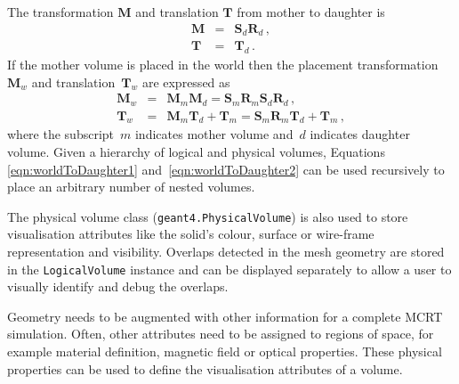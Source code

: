 \documentclass[preprint,12pt]{elsarticle}
\newcommand{\pyinline}[1]{\lstinline[postbreak={}]{#1}}
\begin{document}
The transformation  $\mathbf{M}$  and translation $\mathbf{T}$ from mother to daughter is
\begin{eqnarray}
\mathbf{M} 	& = &  \mathbf{S}_d  \mathbf{R}_d\,, \\
\mathbf{T} 	& = &  \mathbf{T}_d\,.
\end{eqnarray}
%
If the mother volume is placed in the world then the placement transformation~$\mathbf{M}_w$ and translation~$\mathbf{T}_w$ are expressed as
\begin{eqnarray}
\mathbf{M}_w	  	& = & \mathbf{M}_m \mathbf{M}_d  = \mathbf{S}_m \mathbf{R}_m  \mathbf{S}_d \mathbf{R}_d\, ,				\label{eqn:worldToDaughter1}\\
\mathbf{T}	_w 		& = & \mathbf{M}_m \mathbf{T}_d + \mathbf{T}_m= \mathbf{S}_m \mathbf{R}_m \mathbf{T}_d + \mathbf{T}_m\,,  \label{eqn:worldToDaughter2}
\end{eqnarray}
where the subscript~$m$ indicates mother volume and~$d$ indicates daughter volume. Given a hierarchy of logical and physical volumes,
Equations \ref{eqn:worldToDaughter1} and~\ref{eqn:worldToDaughter2} can be used recursively to place an arbitrary number of nested volumes.

The physical volume class (\pyinline{geant4.PhysicalVolume}) is also used to store visualisation attributes like the solid's
colour, surface or wire-frame representation and visibility. Overlaps detected in the mesh geometry are
stored in the \pyinline{LogicalVolume} instance and can be  displayed separately to allow a user to visually identify and debug the overlaps.

Geometry needs to be augmented with other information for a complete MCRT simulation. Often, other attributes need to be
assigned to regions of space, for example material definition, magnetic field or optical properties. These physical properties
can be used to define the visualisation attributes of a volume.
\end{document}
